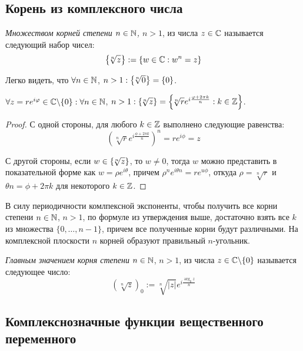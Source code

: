 \subsection{Корень из комплексного числа}

\begin{definition}
	\textit{Множеством корней степени $n \in \mathbb{N}$, $n > 1$}, из числа $z \in \mathbb{C}$ называется следующий набор чисел:
	\[\left\{\!\sqrt[n]{z}\right\} := \left\{w \in \mathbb{C}: w^n = z\right\}\]
\end{definition}

\begin{note}
	Легко видеть, что $\forall n \in \mathbb{N}$, $n > 1: \left\{\!\sqrt[n]{0}\right\} = \{0\}$.
\end{note}

\begin{proposition}
	$\forall z = re^{i\varphi} \in \mathbb{C} \backslash \{0\}: \forall n \in \mathbb{N}$, $n > 1: \left\{\!\sqrt[n]{z}\right\} = \left\{\!\sqrt[n]{r}e^{i\frac{\varphi + 2\pi k}{n}} : k \in \mathbb{Z}\right\}$.
\end{proposition}

\begin{proof}
	С одной стороны, для любого $k \in \mathbb{Z}$ выполнено следующие равенства:
	\[\left(\!\sqrt[n]{r}e^{i\frac{\phi + 2\pi k}{n}}\right)^n = re^{i\phi} = z\]
	
	С другой стороны, если $w \in \left\{\!\sqrt[n]{z}\right\}$, то $w \ne 0$, тогда $w$ можно представить в показательной форме как $w = \rho e^{i\theta}$, причем $\rho^ne^{i\theta n} = re^{u\phi}$, откуда $\rho = \sqrt[n]{r}$ и $\theta n = \phi + 2\pi k$ для некоторого $k \in \mathbb{Z}$.
\end{proof}

\begin{note}
	В силу периодичности комлпексной экспоненты, чтобы получить все корни степени $n \in \mathbb{N}$, $n > 1$, по формуле из утверждения выше, достаточно взять все $k$ из множества $\{0, \dotsc, n - 1\}$, причем все полученные корни будут различными. На комплексной плоскости $n$ корней образуют правильный $n$-угольник.
\end{note}

\begin{definition}
	\textit{Главным значением корня степени} $n \in \mathbb{N}$, $n > 1$, из числа $z \in \mathbb{C} \backslash \{0\}$ называется следующее число:
	\[\left(\!\sqrt[n]{z}\right)_0 := \sqrt[n]{|z|}e^{i\frac{\arg_0z}n}\]
\end{definition}

\subsection{Комплекснозначные функции вещественного переменного}

